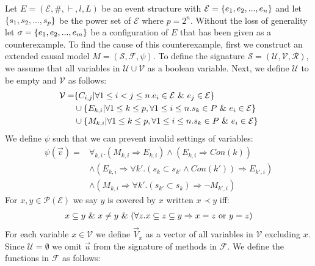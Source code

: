 Let $E = (\mathcal{E},\#,\vdash,l,L)$ be an event structure with
$\mathcal{E} = \{e_1, e_2, ...,e_n\}$ and let $\{s_1,s_2,...,s_p\}$ be the power set of $\mathcal{E}$ where $p = 2^n$.
Without the loss of generality let $\sigma = \{e_1,e_2,...,e_m\}$ be a configuration of $E$ that
has been given as a counterexample.
To find the cause of this counterexample, first we construct an extended causal model $M = (\mathcal{S},\mathcal{F},\psi)$.
To define the signature $\mathcal{S} = (\mathcal{U},\mathcal{V},\mathcal{R})$, we assume that all variables in $\mathcal{U} \cup \mathcal{V}$ as a boolean variable.
Next, we define $\mathcal{U}$ to be empty and $\mathcal{V}$ as follows:
\begin{align*}
    \mathcal{V} = & \{C_{i,j} | \forall 1 \leq i < j \leq n. e_i \in \mathcal{E} \ \& \  e_j \in \mathcal{E}\}                    \\
                  & \cup \{E_{k,i} | \forall 1 \leq k \leq p , \forall 1 \leq i \leq n . s_k \in P \ \& \  e_i \in \mathcal{E} \} \\
                  & \cup \{M_{k,i} | \forall 1 \leq k \leq p , \forall 1 \leq i \leq n . s_k \in P \ \& \  e_i \in \mathcal{E} \} \\
\end{align*}
We define $\psi$ such that we can prevent invalid settings of variables:
\begin{align*}
    \psi(\vec v) = & \forall_{k,i}.
    \left(
    M_{k,i} \Rightarrow E_{k,i}
    \right)
    \wedge
    \left(
    E_{k,i} \Rightarrow Con(k)
    \right)
    \\
                   & \wedge \left(E_{k,i} \Rightarrow
    \forall k'. (s_k \subset s_{k'} \wedge Con(k')) \Rightarrow E_{k',i}
    \right)                                           \\
                   & \wedge \left(
    M_{k,i} \Rightarrow \forall k'.
    (s_{k'} \subset s_k) \Rightarrow \neg M_{k',i}
    \right)
\end{align*}
For $x,y \in \mathcal{P}(\mathcal{E})$ we say $y$ is covered by $x$ written $ x \prec y$ iff:
\begin{align*}
    x \subseteq y \ \& \  x \neq y \ \& \ 
    (\forall z. x \subseteq z \subseteq y \Rightarrow x = z
    \text{ or } y = z)
\end{align*}
For each variable $x \in \mathcal{V}$ we define $\vec V_x$ as a vector
of all variables in $\mathcal{V}$ excluding $x$.
Since $\mathcal{U} = \emptyset$ we omit $\vec u$ from the
signature of methods in $\mathcal{F}$.
We define the functions in $\mathcal{F}$ as follows:
